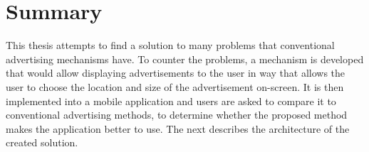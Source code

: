 \section{Summary}
This thesis attempts to find a solution to many problems that conventional advertising mechanisms have. To counter the problems, a mechanism is developed that would allow displaying advertisements to the user in way that allows the user to choose the location and size of the advertisement on-screen. It is then implemented into a mobile application and users are asked to compare it to conventional advertising methods, to determine whether the proposed method makes the application better to use. The next describes the architecture of the created solution.